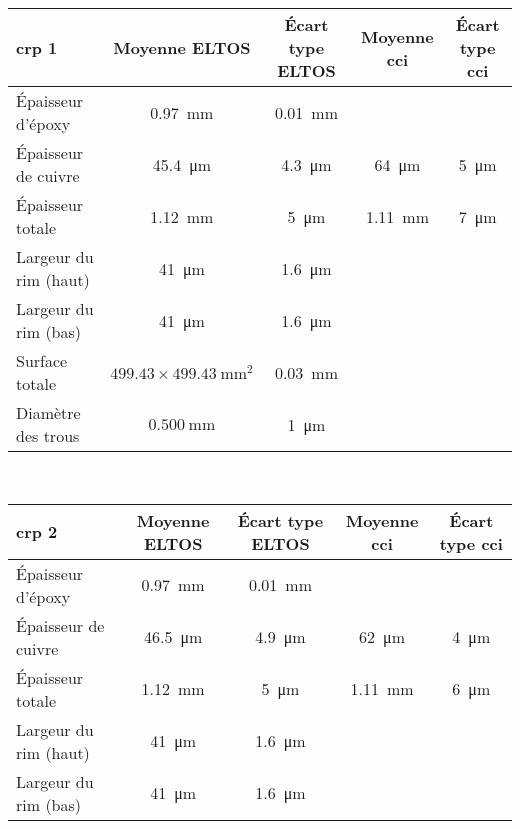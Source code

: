                 \begin{table}
                \centering
                \begin{tabular}{|l|c|c||c|c|}
                    \hline
                    \gls{crp} 1 & Moyenne ELTOS & Écart type ELTOS & Moyenne \gls{cci} & Écart type \gls{cci}\\
                    \hline
                    Épaisseur d'époxy & \SI{0.97}{\milli\meter} & \SI{0.01}{\milli\meter} & &\\
                    Épaisseur de cuivre & \SI{45.4}{\micro\meter} & \SI{4.3}{\micro\meter} & \SI{64}{\micro\meter} & \SI{5}{\micro\meter}\\
                    Épaisseur totale & \SI{1.12}{\milli\meter} &  \SI{5}{\micro\meter} & \SI{1.11}{\milli\meter} &  \SI{7}{\micro\meter}\\
                    Largeur du rim (haut)& \SI{41}{\micro\meter} & \SI{1.6}{\micro\meter} & &\\
                    Largeur du rim (bas)& \SI{41}{\micro\meter} & \SI{1.6}{\micro\meter} & &\\
                    Surface totale &  $499.43\times\SI{499.43}{\milli\meter\squared}$ & \SI{0.03}{\milli\meter} & &\\
                    Diamètre des trous & $\SI{0.500}{\milli\meter}$ & \SI{1}{\micro\meter} & &\\
                     \hline
                \end{tabular}\\
                \begin{tabular}{|l|c|c||c|c|}
                    \hline
                    \gls{crp} 2 & Moyenne ELTOS & Écart type ELTOS & Moyenne \gls{cci} & Écart type \gls{cci}\\
                    \hline
                    Épaisseur d'époxy & \SI{0.97}{\milli\meter} & \SI{0.01}{\milli\meter} & &\\
                    Épaisseur de cuivre & \SI{46.5}{\micro\meter} & \SI{4.9}{\micro\meter} & \SI{62}{\micro\meter} & \SI{4}{\micro\meter} \\
                    Épaisseur totale & \SI{1.12}{\milli\meter} &  \SI{5}{\micro\meter} & \SI{1.11}{\milli\meter} & \SI{6}{\micro\meter}\\
                    Largeur du rim (haut)& \SI{41}{\micro\meter} & \SI{1.6}{\micro\meter} & &\\
                    Largeur du rim (bas)& \SI{41}{\micro\meter} & \SI{1.6}{\micro\meter} & &\\

\end{tabular}
\end{table}
